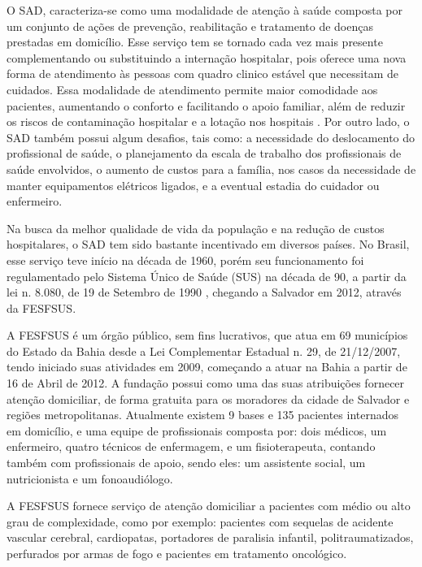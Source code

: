
O \ac{SAD}, caracteriza-se como uma modalidade de atenção à saúde composta por um conjunto de ações de prevenção, reabilitação e tratamento de doenças prestadas em domicílio.
Esse serviço tem se tornado cada vez mais presente complementando ou substituindo a internação hospitalar, pois oferece uma nova forma de atendimento às pessoas com quadro clinico estável que necessitam de cuidados.
Essa modalidade de atendimento permite maior comodidade aos pacientes, aumentando o conforto e facilitando o apoio familiar, além de reduzir os riscos de contaminação hospitalar e a lotação nos hospitais \cite{Kergosien:2009}.
Por outro lado, o \ac{SAD} também possui algum desafios, tais como: a necessidade do deslocamento do profissional de saúde, o planejamento da escala de trabalho dos profissionais de saúde envolvidos, o aumento de custos para a família, nos casos da necessidade de manter equipamentos elétricos ligados, e a eventual estadia do cuidador ou enfermeiro.%

Na busca da melhor qualidade de vida da população e na redução de custos hospitalares, o \ac{SAD} tem sido bastante incentivado em diversos países. 
No Brasil, esse serviço teve início na década de 1960, porém seu funcionamento foi regulamentado pelo Sistema Único de Saúde (SUS) na década de 90, a partir da lei n. 8.080, de 19 de Setembro de 1990 \cite{Silva:2010}, chegando a Salvador em 2012, através da \ac{FESFSUS}. 

A \ac{FESFSUS} é um órgão público, sem fins lucrativos, que atua em 69 municípios do Estado da Bahia desde a Lei Complementar Estadual n. 29, de 21/12/2007, tendo iniciado suas atividades em 2009, começando a atuar na Bahia a partir de 16 de Abril de 2012. A fundação possui como uma das suas atribuições fornecer atenção domiciliar, de forma gratuita para os moradores da cidade de Salvador e regiões metropolitanas. Atualmente existem 9 bases e 135 pacientes internados em domicílio, e uma equipe de profissionais composta por: dois médicos, um enfermeiro, quatro técnicos de enfermagem, e um fisioterapeuta, contando também com profissionais de apoio, sendo eles: um assistente social, um nutricionista e um fonoaudiólogo.

A \ac{FESFSUS} fornece serviço de atenção domiciliar a pacientes com médio ou alto grau de complexidade, como por exemplo: pacientes com sequelas de acidente vascular cerebral, cardiopatas, portadores de paralisia infantil, politraumatizados, perfurados por armas de fogo e pacientes em tratamento oncológico.

